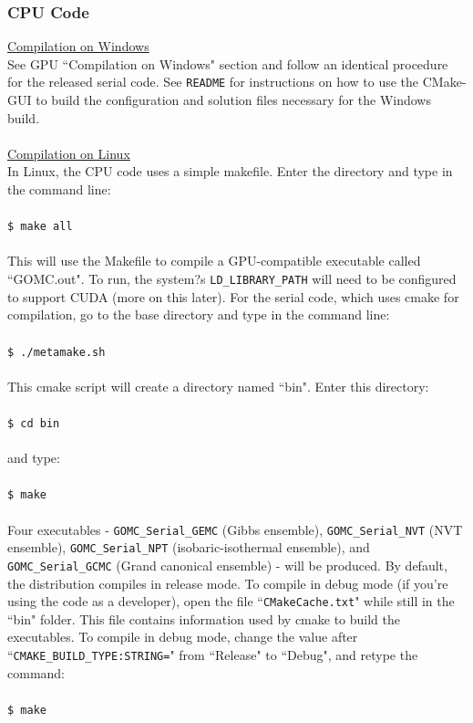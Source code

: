 \subsubsection{CPU Code}
\underline{Compilation on Windows}\\
See GPU ``Compilation on Windows" section and follow an identical procedure for the released serial code. See \texttt{README} for instructions on how to use the CMake-GUI to build the configuration and solution files necessary for the Windows build.\\\\
\underline{Compilation on Linux}\\
In Linux, the CPU code uses a simple makefile. Enter the directory and type in the command line:\\\\
\texttt{\$ make all}\\\\
This will use the Makefile to compile a GPU-compatible executable called ``GOMC.out".  To run, the system?s \texttt{LD\_LIBRARY\_PATH} will need to be configured to support CUDA (more on this later).
For the serial code, which uses cmake for compilation, go to the base directory and type in the command line:\\\\
\texttt{\$ ./metamake.sh}\\\\
This cmake script will create a directory named ``bin".  Enter this directory:\\\\
\texttt{\$ cd bin}\\\\
and type:\\\\
\texttt{\$ make}\\\\
Four executables - \texttt{GOMC\_Serial\_GEMC} (Gibbs ensemble), \texttt{GOMC\_Serial\_NVT} (NVT ensemble), \texttt{GOMC\_Serial\_NPT} (isobaric-isothermal ensemble), and \texttt{GOMC\_Serial\_GCMC} (Grand canonical ensemble) - will be produced. By default, the distribution compiles in release mode.  To compile in debug mode (if you're using the code as a developer), open the file ``\texttt{CMakeCache.txt}" while still in the ``bin" folder.  This file contains information used by cmake to build the executables.  To compile in debug mode, change the value after ``\texttt{CMAKE\_BUILD\_TYPE:STRING=}" from ``Release" to ``Debug", and retype the command:\\\\ \texttt{\$ make}\\\\
